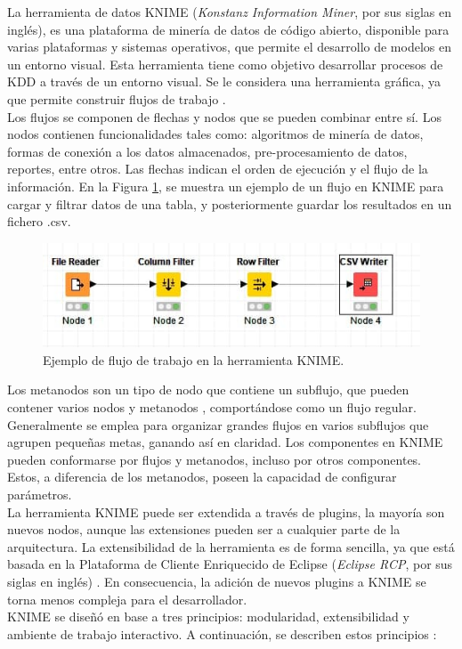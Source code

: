 La herramienta de datos KNIME (\textit{Konstanz Information Miner}, por sus siglas en inglés), es una plataforma de minería de datos de código abierto, disponible para varias plataformas y sistemas operativos, que permite el desarrollo de modelos en un entorno visual. Esta herramienta tiene como objetivo desarrollar procesos de KDD a través de un entorno visual. Se le considera una herramienta gráfica, ya que permite construir flujos de trabajo \citep{knime2023}. \\
Los flujos se componen de flechas y nodos que se pueden combinar entre sí. Los nodos contienen funcionalidades tales como: algoritmos de minería de datos, formas de conexión a los datos almacenados, pre-procesamiento de datos, reportes, entre otros. Las flechas indican el orden de ejecución y el flujo de la información. En la Figura \ref{fig:ejemploworkflow}, se muestra un ejemplo de un flujo en KNIME para cargar y filtrar datos de una tabla, y posteriormente guardar los resultados en un fichero .csv. 
\begin{figure}[H]
	\centering
	\includegraphics[width=0.9\linewidth]{figuras/capi 1/ejemplo_workflow}
	\caption{Ejemplo de flujo de trabajo en la herramienta KNIME.}
	\label{fig:ejemploworkflow}
\end{figure}
Los metanodos son un tipo de nodo que contiene un subflujo, que pueden contener varios nodos y metanodos \citep{berthold2009knime}, comportándose como un flujo regular. Generalmente se emplea para organizar grandes flujos en varios subflujos que agrupen pequeñas metas, ganando así en claridad. Los componentes en KNIME pueden conformarse por flujos y metanodos, incluso por otros componentes. Estos, a diferencia de los metanodos, poseen la capacidad de configurar parámetros. \\
La herramienta KNIME puede ser extendida a través de plugins, la mayoría son nuevos nodos, aunque las extensiones pueden ser a cualquier parte de la arquitectura. La extensibilidad de la herramienta es de forma sencilla, ya que está basada en la Plataforma de Cliente Enriquecido de Eclipse (\textit{Eclipse RCP}, por sus siglas en inglés) \citep{berthold2009knime}. En consecuencia, la adición de nuevos plugins a KNIME se torna menos compleja para el desarrollador. \\
KNIME se diseñó en base a tres principios: modularidad, extensibilidad y ambiente de trabajo interactivo. A continuación, se describen estos principios \citep{Lisandra2012}:

